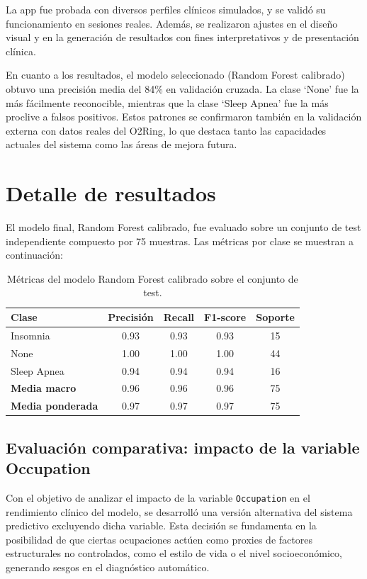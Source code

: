 La app fue probada con diversos perfiles clínicos simulados, y se validó su funcionamiento en sesiones reales. Además, se realizaron ajustes en el diseño visual y en la generación de resultados con fines interpretativos y de presentación clínica.

En cuanto a los resultados, el modelo seleccionado (Random Forest calibrado) obtuvo una precisión media del 84\% en validación cruzada. La clase ‘None’ fue la más fácilmente reconocible, mientras que la clase ‘Sleep Apnea’ fue la más proclive a falsos positivos. Estos patrones se confirmaron también en la validación externa con datos reales del O2Ring, lo que destaca tanto las capacidades actuales del sistema como las áreas de mejora futura.


\section{Detalle de resultados}
\label{sec:resultados}

El modelo final, Random Forest calibrado, fue evaluado sobre un conjunto de test independiente compuesto por 75 muestras. Las métricas por clase se muestran a continuación:

\begin{table}[H]
\centering
\begin{tabular}{|l|c|c|c|c|}
\hline
\textbf{Clase} & \textbf{Precisión} & \textbf{Recall} & \textbf{F1-score} & \textbf{Soporte} \\
\hline
Insomnia      & 0.93 & 0.93 & 0.93 & 15 \\
None          & 1.00 & 1.00 & 1.00 & 44 \\
Sleep Apnea   & 0.94 & 0.94 & 0.94 & 16 \\
\hline
\textbf{Media macro} & 0.96 & 0.96 & 0.96 & 75 \\
\textbf{Media ponderada} & 0.97 & 0.97 & 0.97 & 75 \\
\hline
\end{tabular}
\caption{Métricas del modelo Random Forest calibrado sobre el conjunto de test.}
\end{table}

\subsection{Evaluación comparativa: impacto de la variable Occupation}

Con el objetivo de analizar el impacto de la variable \texttt{Occupation} en el rendimiento clínico del modelo, se desarrolló una versión alternativa del sistema predictivo excluyendo dicha variable. Esta decisión se fundamenta en la posibilidad de que ciertas ocupaciones actúen como proxies de factores estructurales no controlados, como el estilo de vida o el nivel socioeconómico, generando sesgos en el diagnóstico automático.

